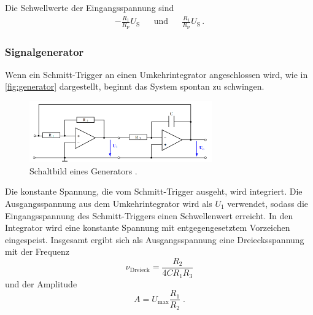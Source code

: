 
Die Schwellwerte der Eingangsspannung sind 
\begin{align}
    - \frac{R_1}{R_\text{P}} U_\text{S} && \text{und} && \frac{R_1}{R_\text{P}} U_\text{S} \, .
    \label{eqn:schwell}
\end{align}

\subsubsection{Signalgenerator}

\noindent 
Wenn ein Schmitt-Trigger an einen Umkehrintegrator angeschlossen wird, wie in \autoref{fig:generator} dargestellt, beginnt das System spontan zu schwingen. 
\begin{figure}
    \centering
    \includegraphics[width=0.7\textwidth]{generator.png}
    \caption{Schaltbild eines Generators \cite{ap51}.}
    \label{fig:generator}
\end{figure}

\noindent
Die konstante Spannung, die vom Schmitt-Trigger ausgeht, wird integriert. Die Ausgangsspannung aus dem Umkehrintegrator wird als $U_1$ verwendet, sodass die Eingangsspannung des Schmitt-Triggers einen Schwellenwert erreicht. In den Integrator wird eine konstante Spannung mit entgegengesetztem Vorzeichen eingespeist. Insgesamt ergibt sich als Ausgangsspannung eine Dreiecksspannung mit 
der Frequenz
\begin{equation}
    \nu_\text{Dreieck} = \frac{R_2}{4 C R_1 R_3}
    \label{eqn:fdrei}
\end{equation}
und der Amplitude 
\begin{equation}
    A =  U_\text{max} \frac{R_1}{R_2}\;.
    \label{eqn:amp2}
\end{equation}

